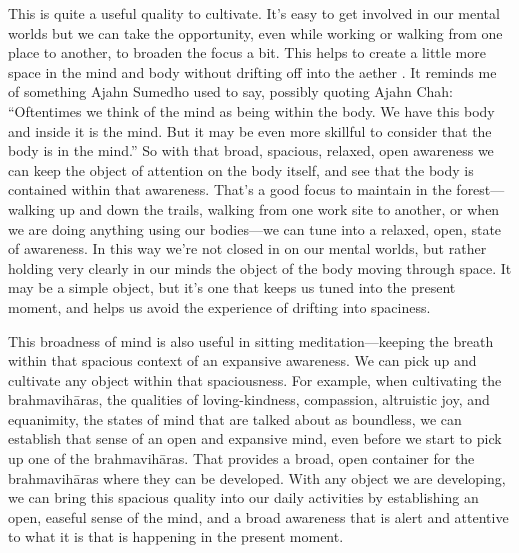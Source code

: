 This is quite a useful quality to cultivate. It's easy to get involved 
in our mental worlds but we can take the opportunity, even while 
working or walking from one place to another, to broaden the focus a 
bit. This helps to create a little more space in the mind and body 
without drifting off into the aether . It reminds me of something Ajahn 
Sumedho used to say, possibly quoting Ajahn Chah: ``Oftentimes we think 
of the mind as being within the body. We have this body and inside it 
is the mind. But it may be even more skillful to consider that the body 
is in the mind.'' So with that broad, spacious, relaxed, open awareness 
we can keep the object of attention on the body itself, and see that 
the body is contained within that awareness. That's a good focus to 
maintain in the forest---walking up and down the trails, walking from 
one work site to another, or when we are doing anything using our 
bodies---we can tune into a relaxed, open, state of awareness. In this 
way we're not closed in on our mental worlds, but rather holding very 
clearly in our minds the object of the body moving through space. It 
may be a simple object, but it's one that keeps us tuned into the 
present moment, and helps us avoid the experience of drifting into 
spaciness.

This broadness of mind is also useful in sitting meditation---keeping 
the breath within that spacious context of an expansive awareness. We 
can pick up and cultivate any object within that spaciousness. For 
example, when cultivating the brahmavihāras, the qualities of 
loving-kindness, compassion, altruistic joy, and equanimity, the states 
of mind that are talked about as boundless, we can establish that sense 
of an open and expansive mind, even before we start to pick up one of 
the brahmavihāras. That provides a broad, open container for the 
brahmavihāras where they can be developed. With any object we are 
developing, we can bring this spacious quality into our daily 
activities by establishing an open, easeful sense of the mind, and a 
broad awareness that is alert and attentive to what it is that is 
happening in the present moment.


